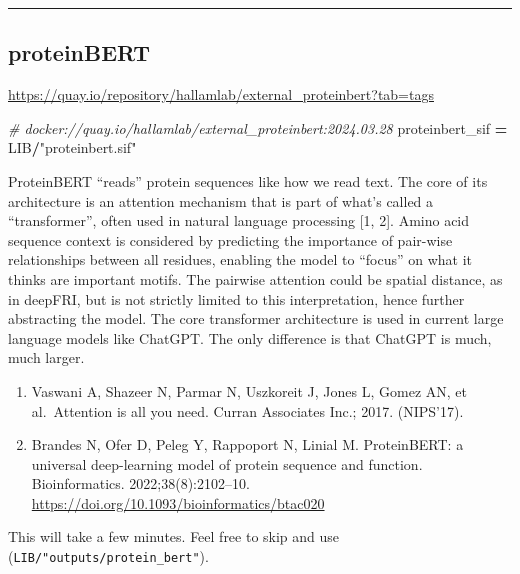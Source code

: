 \documentclass[
]{book}
\newenvironment{Shaded}{\begin{snugshade}}{\end{snugshade}}
\newcommand{\CommentTok}[1]{\textcolor[rgb]{0.56,0.35,0.01}{\textit{#1}}}
\newcommand{\NormalTok}[1]{#1}
\newcommand{\OperatorTok}[1]{\textcolor[rgb]{0.81,0.36,0.00}{\textbf{#1}}}
\newcommand{\StringTok}[1]{\textcolor[rgb]{0.31,0.60,0.02}{#1}}
\providecommand{\tightlist}{%
  \setlength{\itemsep}{0pt}\setlength{\parskip}{0pt}}
\begin{document}
\begin{center}\rule{0.5\linewidth}{0.5pt}\end{center}

\subsection{proteinBERT}\label{proteinbert}

\url{https://quay.io/repository/hallamlab/external_proteinbert?tab=tags}

\begin{Shaded}
\begin{Highlighting}[numbers=left,,]
\CommentTok{\# docker://quay.io/hallamlab/external\_proteinbert:2024.03.28}
\NormalTok{proteinbert\_sif }\OperatorTok{=}\NormalTok{ LIB}\OperatorTok{/}\StringTok{"proteinbert.sif"}
\end{Highlighting}
\end{Shaded}

ProteinBERT ``reads'' protein sequences like how we read text. The core of its architecture is an attention mechanism that is
part of what's called a ``transformer'', often used in natural language processing {[}1, 2{]}. Amino acid sequence context is considered by
predicting the importance of pair-wise relationships between all residues, enabling the model to ``focus'' on what it thinks are important motifs.
The pairwise attention could be spatial distance, as in deepFRI, but is not strictly limited to this interpretation,
hence further abstracting the model. The core transformer architecture is used in current large language models like ChatGPT.
The only difference is that ChatGPT is much, much larger.

\begin{enumerate}
\def\labelenumi{\arabic{enumi}.}
\tightlist
\item
  Vaswani A, Shazeer N, Parmar N, Uszkoreit J, Jones L, Gomez AN, et al.~Attention is all you need. Curran Associates Inc.; 2017. (NIPS'17).
\item
  Brandes N, Ofer D, Peleg Y, Rappoport N, Linial M. ProteinBERT: a universal deep-learning model of protein sequence and function. Bioinformatics. 2022;38(8):2102--10. \url{https://doi.org/10.1093/bioinformatics/btac020}
\end{enumerate}

This will take a few minutes. Feel free to skip and use (\texttt{LIB/"outputs/protein\_bert"}).
\end{document}
